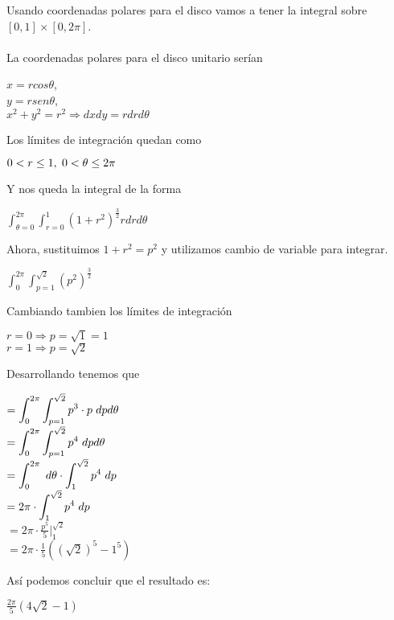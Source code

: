 Usando coordenadas polares para el disco vamos a tener la integral sobre $[0, 1] \times [0, 2\pi]$. \\\\ 
La coordenadas polares para el disco unitario serían 
\begin{center}
    $x = r cos \theta$, \\
    \vspace{5 pt}
    $y = r sen \theta$, \\
    \vspace{5 pt}
    $x^2 + y^2  = r^2 \Rightarrow dxdy = rdrd\theta$\\
\end{center}
\vspace{15 pt}
Los límites de integración quedan como
\begin{center}
    $0 < r \leq 1, \hspace{3 pt} 0 < \theta \leq 2\pi$
\end{center}
\vspace{15 pt}
Y nos queda la integral de la forma 
\begin{center}
    $\displaystyle \int_{\theta = 0}^{2\pi}\int_{r = 0}^1 (1 + r^2)^{\frac{3}{2}} rdrd\theta$
\end{center}
\vspace{15 pt}
Ahora, sustituimos $1 + r^2 = p^2$ y utilizamos cambio de variable para integrar.
\begin{center}
    $\displaystyle \int_0^{2\pi}\int_{p=1}^{\sqrt{2}} (p^2)^{\frac{3}{2}}$
\end{center}
\vspace{15 pt}
Cambiando tambien los límites de integración
\begin{center}
    $r = 0 \Rightarrow p = \sqrt{1} = 1$\\
    $r = 1 \Rightarrow p = \sqrt{2}$\\
\end{center}
\vspace{15 pt}
Desarrollando tenemos que 
\begin{center}
    $\displaystyle = \int_0^{2\pi}\int_{p=1}^{\sqrt{2}} p^3 \cdot p \hspace{3 pt}dpd\theta$\\
    \vspace{10 pt}
    $\displaystyle = \int_0^{2\pi}\int_{p=1}^{\sqrt{2}} p^4 \hspace{3 pt}dpd\theta$\\
    \vspace{10 pt}
    $\displaystyle = \int_0^{2\pi} \hspace{3 pt} d\theta\cdot \int_1^{\sqrt{2}} p^4\hspace{3 pt} dp$\\
    \vspace{10 pt}
    $\displaystyle = 2\pi \cdot \int_1^{\sqrt{2}} p^4 \hspace{3 pt} dp$\\
    \vspace{10 pt}
    $\displaystyle = 2\pi \cdot \frac{p^5}{5} \Big|_1^{\sqrt{2}}$\\
    \vspace{10 pt}
    $\displaystyle = 2\pi \cdot \frac{1}{5}((\sqrt{2})^5 - 1^5)$\\
\end{center}
\vspace{15 pt}
Así podemos concluir que el resultado es:
\begin{center}
    $\boxed{\frac{2\pi}{5} (4\sqrt{2} - 1)}$
\end{center}
\vspace{15 pt}
